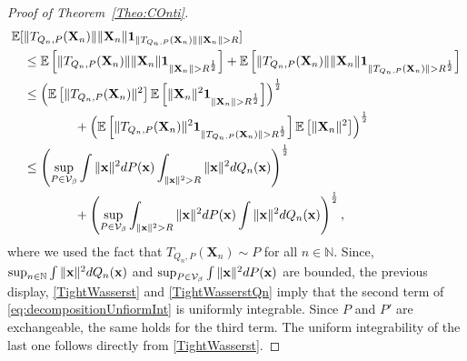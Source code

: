 \documentclass{imsart}
\numberwithin{equation}{section}
\def\N{\mathbb{N}}
\def\E{\mathbb{E}}
\def\x{\mathbf{x}}
\def\X{\mathbf{X}}
\def\E{\mathbb E}
\def\N{\mathbb N}
\def\x{\mathbf x}
\begin{document}
\begin{proof}[Proof of Theorem~\ref{Theo:COnti}]
	\begin{align*}
		\E[&\|T_{Q_{n} ,P}(\X_n)\|\|\X_n\|{\bf 1}_{\|T_{Q_{n} ,P}(\X_n)\|\|\X_n\|>R}] \\
		&\leq \E\left[\|T_{Q_{n} ,P}(\X_n)\|\|\X_n\|{\bf 1}_{\|\X_n\|>R^{\frac{1}{2}}}\right]+\E\left[\|T_{Q_{n} ,P}(\X_n)\|\|\X_n\|{\bf 1}_{\|T_{Q_{n} ,P}(\X_n)\|>R^{\frac{1}{2}}}\right]\\
		&\leq \left(\E\left[\|T_{Q_{n} ,P}(\X_n)\|^2\right]\E\left[\|\X_n\|^2{\bf 1}_{\|\X_n\|>R^{\frac{1}{2}}}\right]\right)^{\frac{1}{2}}\\
		&\qquad \qquad+\left(\E\left[\|T_{Q_{n} ,P}(\X_n)\|^2 {\bf 1}_{\|T_{Q_{n} ,P}(\X_n)\|>R^{\frac{1}{2}}}\right] \E\left[\|\X_n\|^2\right]\right)^{\frac{1}{2}}\\
		&\leq  \left(\sup_{P\in \mathcal{V}_\beta}\int \|\x\|^2 {\rm d} P(\x)\int_{\|\x\|^2> R} \|\x\|^2 {\rm d} Q_n(\x) \right)^{\frac{1}{2}}\\
		&\qquad \qquad+\left(\sup_{P\in \mathcal{V}_\beta}\int_{\|\x\|^2> R} \|\x\|^2 {\rm d} P(\x) \int \|\x\|^2 {\rm d} Q_n(\x)\right)^{\frac{1}{2}},
	\end{align*}
	where we used the fact that $T_{Q_{n} ,P}(\X_n)\sim P$ for all $n\in \N$.  Since, 
	$ \sup_{n\in \N}\int \|\x\|^2 {\rm d} Q_n(\x)  $ and $\sup_{P\in \mathcal{V}_\beta}\int \|\x\|^2 {\rm d} P(\x)$ are bounded, the previous display,  \eqref{TightWasserst} and \eqref{TightWasserstQn} imply that the second  term of \eqref{eq:decompositionUnfiormInt} is uniformly integrable. Since $P$ and $P'$ are exchangeable, the same holds for the third term. The uniform integrability of the last one follows directly from \eqref{TightWasserst}. 
\end{proof}
\end{document}

